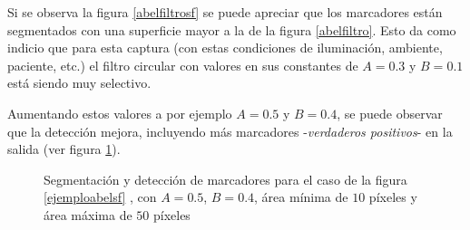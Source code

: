 Si se observa la figura \ref{abelfiltrosf} se puede apreciar que los marcadores están segmentados con una superficie mayor a la de la figura \ref{abelfiltro}.  Esto da como indicio que para esta captura (con estas condiciones de iluminación, ambiente, paciente, etc.) el filtro circular con valores en sus constantes de $A=0.3$ y $B=0.1$ está siendo muy selectivo.

Aumentando estos valores a por ejemplo $A=0.5$ y $B=0.4$, se puede observar que la detección mejora, incluyendo más marcadores -\textit{verdaderos positivos}- en la salida (ver figura \ref{ejemploabel2}).

\begin{figure}[ht!]
        \hspace{-1cm}
        \hspace{1 mm}
  \caption{Segmentación y detección de marcadores para el caso de la figura \ref{ejemploabelsf} , con $A=0.5$, $B=0.4$, área mínima de $10$ píxeles y área máxima de $50$ píxeles}
      \label{ejemploabel2}
\end{figure}

